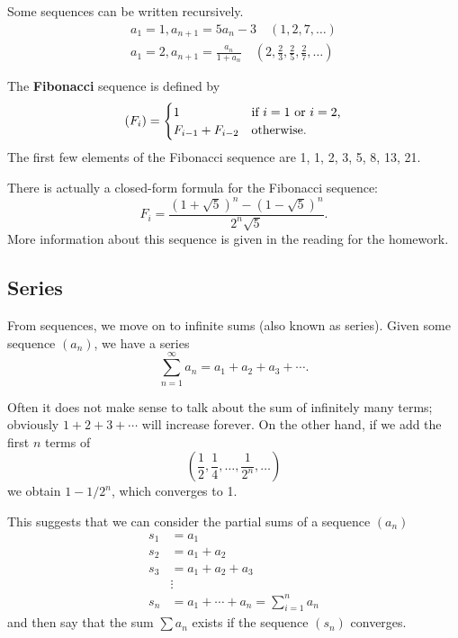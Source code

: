 Some sequences can be written recursively.
\begin{gather*}
  a_1 = 1, a_{n + 1} = 5a_n - 3 \quad (1, 2, 7, \dots)\\
  a_1 = 2, a_{n + 1} = \frac{a_n}{1 + a_n} \quad \left(2, \frac{2}{3}, \frac{2}{5}, \frac{2}{7}, \dots\right)
\end{gather*}

\begin{ex}
  The \textbf{Fibonacci} sequence is defined by
  \begin{displaymath}
    (F_i) = \begin{cases}
      1 & \text{if $ i = 1 $ or $ i = 2 $,}\\
      F_{i - 1} + F_{i - 2} & \text{otherwise.}
    \end{cases}
  \end{displaymath}
  The first few elements of the Fibonacci sequence are 1, 1, 2, 3, 5, 8, 13, 21.

  There is actually a closed-form formula for the Fibonacci sequence:
  \begin{displaymath}
    F_i = \frac{\left(1 + \sqrt{5}\right)^n - \left(1 - \sqrt{5}\right)^n}{2^n \sqrt{5}}.
  \end{displaymath}
  More information about this sequence is given in the reading for the homework.
\end{ex}

\subsection*{Series}
From sequences, we move on to infinite sums (also known as series). Given some sequence $ (a_n) $, we have a series
\begin{displaymath}
  \sum_{n = 1}^\infty a_n = a_1 + a_2 + a_3 + \cdots.
\end{displaymath}

Often it does not make sense to talk about the sum of infinitely many terms; obviously $ 1 + 2 + 3 + \cdots $ will increase
forever. On the other hand, if we add the first $ n $ terms of
\begin{displaymath}
  \left(\frac{1}{2}, \frac{1}{4}, \dots, \frac{1}{2^n}, \dots\right)
\end{displaymath}
we obtain $ 1 - 1/2^n $, which converges to 1.

This suggests that we can consider the partial sums of a sequence $ (a_n) $
\begin{align*}
  s_1 &= a_1\\
  s_2 &= a_1 + a_2\\
  s_3 &= a_1 + a_2 + a_3\\
      &\vdots\\
  s_n &= a_1 + \cdots + a_n = \sum_{i = 1}^n a_n
\end{align*}
and then say that the sum $ \sum a_n $ exists if the sequence $ (s_n) $ converges.

